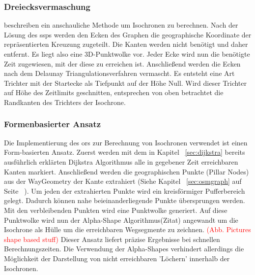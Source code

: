 \documentclass[12pt,a4paper]{article}
\newcommand\todo[1]{\textcolor{red}{#1}}
\begin{document}
\subsubsection{Dreiecksvermaschung}
\cite{isochrones} beschreiben ein anschauliche Methode um Isochronen zu berechnen. 
Nach der Lösung des \gls{ssp}s werden den Ecken des Graphen die geographische Koordinate der repräsentierten Kreuzung zugeteilt. Die Kanten werden nicht benötigt und daher entfernt. 
Es liegt also eine 3D-Punktwolke vor. 
Jeder Ecke wird nun die benötigte Zeit zugewiesen, mit der diese zu erreichen ist. 
Anschließend werden die Ecken nach dem Delaunay Triangulationsverfahren vermascht. 
Es entsteht eine Art Trichter mit der Startecke als Tiefpunkt auf der Höhe Null. 
Wird dieser Trichter auf Höhe des Zeitlimits geschnitten, entsprechen von oben betrachtet die Randkanten des Trichters der Isochrone.


\subsubsection{Formenbasierter Ansatz}
Die Implementierung des \gls{ors} zur Berechnung von Isochronen verwendet ist einen Form-basierten Ansatz. Zuerst werden mit dem in Kapitel ~\ref{sec:dijkstra} bereits ausführlich erklärten Dijkstra Algorithmus alle in gegebener Zeit erreichbaren Kanten markiert. Anschließend werden die geographischen Punkte (Pillar Nodes) aus der WayGeometry der Kante extrahiert (Siehe Kapitel ~\ref{sec:osmgraph} auf Seite ~\pageref{sec:osmgraph}). Um jeden der extrahierten Punkte wird ein kreisförmiger Pufferbereich gelegt. Dadurch können nahe beieinanderliegende Punkte übersprungen werden. Mit den verbleibenden Punkten wird eine Punktwolke generiert. Auf diese Punktwolke wird nun der Alpha-Shape Algorithmus(Zitat) angewandt um die Isochrone als Hülle um die erreichbaren Wegsegmente zu zeichnen.
\todo{(Abb. Pictures shape based stuff)}
Dieser Ansatz liefert präzise Ergebnisse bei schnellen Berechnungszeiten. Die Verwendung der Alpha-Shapes verhindert allerdings die Möglichkeit der Darstellung von nicht erreichbaren 'Löchern' innerhalb der Isochronen.

\newpage
\end{document}
